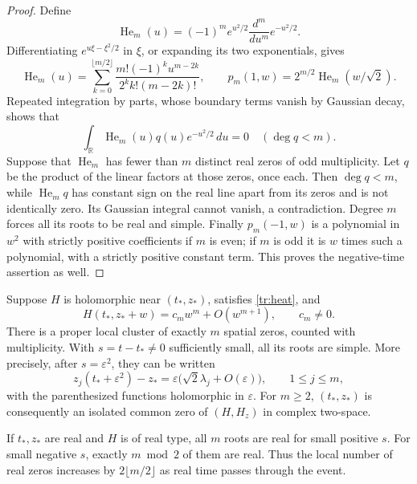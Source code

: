 \begin{proof}
Define
\[
 \operatorname{He}_m(u)=(-1)^m e^{u^2/2}
                       \frac{d^m}{du^m}e^{-u^2/2}.
\]
Differentiating $e^{u\xi-\xi^2/2}$ in $\xi$, or expanding its two
exponentials, gives
\[
 \operatorname{He}_m(u)=
 \sum_{k=0}^{\lfloor m/2\rfloor}
 \frac{m!(-1)^k u^{m-2k}}{2^k k!(m-2k)!},
 \qquad p_m(1,w)=2^{m/2}\operatorname{He}_m(w/\sqrt2).
\]
Repeated integration by parts, whose boundary terms vanish by Gaussian
decay, shows that
\[
 \int_{\mathbb R}\operatorname{He}_m(u)q(u)e^{-u^2/2}\,du=0
                      \quad(\deg q<m).
\]
Suppose that $\operatorname{He}_m$ has fewer than $m$ distinct real zeros
of odd multiplicity.  Let $q$ be the product of the linear factors at
those zeros, once each.  Then $\deg q<m$, while
$\operatorname{He}_m q$ has constant sign on the real line apart from
its zeros and is not identically zero.  Its Gaussian integral cannot
vanish, a contradiction.  Degree $m$ forces all its roots to be real and
simple.  Finally $p_m(-1,w)$ is a polynomial in $w^2$ with strictly
positive coefficients if $m$ is even; if $m$ is odd it is $w$ times such
a polynomial, with a strictly positive constant term.  This proves the
negative-time assertion as well.
\end{proof}

\begin{theorem}\label{tr:splitting}
Suppose $H$ is holomorphic near $(t_*,z_*)$, satisfies
\eqref{tr:heat}, and
\[
 H(t_*,z_*+w)=c_m w^m+O(w^{m+1}),\qquad c_m\ne0.
\]
There is a proper local cluster of exactly $m$ spatial zeros, counted
with multiplicity.  With $s=t-t_*\ne0$ sufficiently small, all its roots
are simple.  More precisely, after $s=\varepsilon^2$, they can be written
\begin{equation}\label{tr:root-expansion}
 z_j(t_*+\varepsilon^2)-z_*
       =\varepsilon\bigl(\sqrt2\lambda_j+O(\varepsilon)\bigr),
       \qquad 1\leq j\leq m,
\end{equation}
with the parenthesized functions holomorphic in $\varepsilon$.
For $m\geq2$, $(t_*,z_*)$ is consequently an isolated common zero of
$(H,H_z)$ in complex two-space.

If $t_*,z_*$ are real and $H$ is of real type, all $m$ roots are real
for small positive $s$.  For small negative $s$, exactly $m\bmod2$ of
them are real.  Thus the local number of real zeros increases by
$2\lfloor m/2\rfloor$ as real time passes through the event.
\end{theorem}

